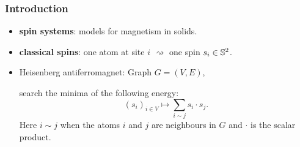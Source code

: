 \documentclass[mathserif]{beamer}
\begin{document}
\begin{frame}
  \frametitle{Introduction}
  \begin{itemize}
  \item<1-> {\bfseries spin systems}: models for magnetism in solids.
  \item<2-> {\bfseries classical spins}: one atom at site $i$
    $\rightsquigarrow$ one spin $s_i\in \S^2$.
  \item<3> Heisenberg antiferromagnet: Graph $G=(V,E)$,
    
    search the minima of the following energy:
    \[
      (s_i)_{i\in V}\mapsto\sum_{i\sim j}s_i\cdot s_j.
    \]
    Here $i\sim j$ when the atoms $i$ and $j$ are neighbours in $G$
    and $\cdot$ is the scalar product.
  \end{itemize}
\end{frame}
\end{document}
